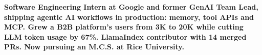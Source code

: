 \item\small{\textbf{Software Engineering Intern at Google and former GenAI Team Lead, shipping agentic AI workflows in production: memory, tool APIs and MCP. Grew a B2B platform's users from 3K to 20K while cutting LLM token usage by 67\%. LlamaIndex contributor with 14 merged PRs. Now pursuing an M.C.S. at Rice University.}}%